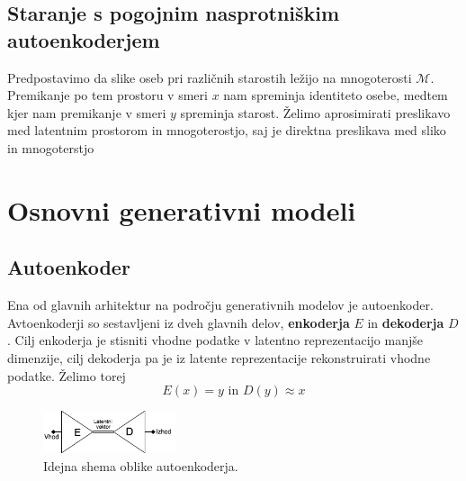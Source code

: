 \documentclass[12pt,a4paper,twoside]{article}
\theoremstyle{definition} %
\theoremstyle{plain} %
\numberwithin{equation}{section}  %
\begin{document}
\subsection{Staranje s pogojnim nasprotniškim autoenkoderjem}
Predpostavimo da slike oseb pri različnih starostih ležijo na mnogoterosti $\mathcal{M}$. Premikanje po tem prostoru v smeri $x$ nam spreminja identiteto osebe, medtem kjer nam premikanje v smeri $y$ spreminja
starost. Želimo aprosimirati preslikavo med latentnim prostorom in mnogoterostjo, saj je direktna preslikava med sliko in mnogoterstjo 

\section{Osnovni generativni modeli}
\subsection{Autoenkoder}
Ena od glavnih arhitektur na področju generativnih modelov je autoenkoder. Avtoenkoderji so sestavljeni iz dveh glavnih delov, \textbf{enkoderja} $E$ in \textbf{dekoderja} $D$. 
Cilj enkoderja je stisniti vhodne podatke v latentno reprezentacijo manjše dimenzije, cilj dekoderja pa je iz latente reprezentacije rekonstruirati vhodne podatke. 
Želimo torej $$ E(x) = y \text{ in } D(y) \approx x $$ 

\begin{figure}[ht]
  \centering
  \includegraphics[width=0.35\textwidth]{images/autoencoder_schema.png}
 \caption[Idejna shema oblike autoenkoderja]{Idejna shema oblike autoenkoderja.}
  \label{fig:autoencoder-shape}
\end{figure}
\end{document}
